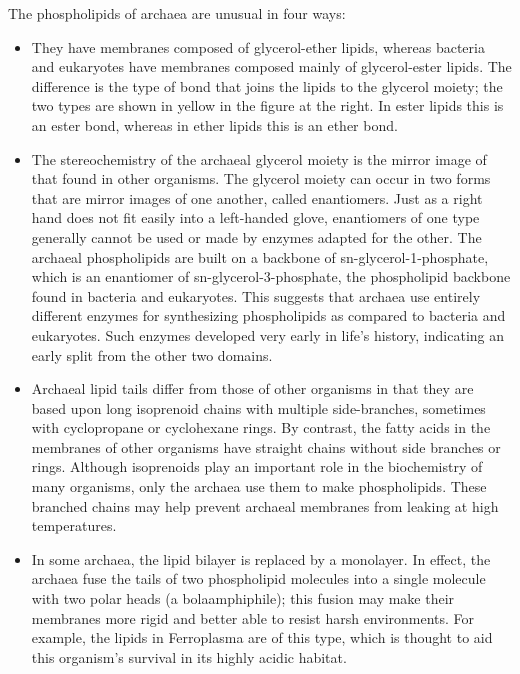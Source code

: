 The phospholipids of archaea are unusual in four ways:

\begin{itemize}
\tightlist
\item
  They have membranes composed of glycerol-ether lipids, whereas bacteria and eukaryotes have membranes composed mainly of glycerol-ester lipids. The difference is the type of bond that joins the lipids to the glycerol moiety; the two types are shown in yellow in the figure at the right. In ester lipids this is an ester bond, whereas in ether lipids this is an ether bond.
\item
  The stereochemistry of the archaeal glycerol moiety is the mirror image of that found in other organisms. The glycerol moiety can occur in two forms that are mirror images of one another, called enantiomers. Just as a right hand does not fit easily into a left-handed glove, enantiomers of one type generally cannot be used or made by enzymes adapted for the other. The archaeal phospholipids are built on a backbone of sn-glycerol-1-phosphate, which is an enantiomer of sn-glycerol-3-phosphate, the phospholipid backbone found in bacteria and eukaryotes. This suggests that archaea use entirely different enzymes for synthesizing phospholipids as compared to bacteria and eukaryotes. Such enzymes developed very early in life's history, indicating an early split from the other two domains.
\item
  Archaeal lipid tails differ from those of other organisms in that they are based upon long isoprenoid chains with multiple side-branches, sometimes with cyclopropane or cyclohexane rings. By contrast, the fatty acids in the membranes of other organisms have straight chains without side branches or rings. Although isoprenoids play an important role in the biochemistry of many organisms, only the archaea use them to make phospholipids. These branched chains may help prevent archaeal membranes from leaking at high temperatures.
\item
  In some archaea, the lipid bilayer is replaced by a monolayer. In effect, the archaea fuse the tails of two phospholipid molecules into a single molecule with two polar heads (a bolaamphiphile); this fusion may make their membranes more rigid and better able to resist harsh environments. For example, the lipids in Ferroplasma are of this type, which is thought to aid this organism's survival in its highly acidic habitat.
\end{itemize}




